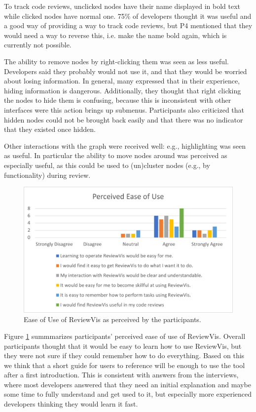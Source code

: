 \documentclass[a4paper,11pt,twoside]{article}
\theoremstyle{definition} %
\begin{document}
To track code reviews, unclicked nodes have their name displayed in bold text while clicked nodes have normal one. 75\% of developers thought it was useful and a good way of providing a way to track code reviews, but P4 mentioned that they would need a way to reverse this, i.e. make the name bold again, which is currently not possible. 

The ability to remove nodes by right-clicking them was seen as less useful. Developers said they probably would not use it, and that they would be worried about losing information. In general, many expressed that in their experience, hiding information is dangerous. Additionally, they thought that right clicking the nodes to hide them is confusing, because this is inconsistent with other interfaces were this action brings up submenus. Participants also criticized that hidden nodes could not be brought back easily and that there was no indicator that they existed once hidden. 

Other interactions with the graph were received well: e.g., highlighting was seen as useful. In particular the ability to move nodes around was perceived as especially useful, as this could be used to (un)cluster nodes (e.g., by functionality) during review.

\begin{figure}[h]
    \centering
    \includegraphics[width=1.0\textwidth]{Subfigures/perceived_ease_of_use.png}
    \caption{Ease of Use of ReviewVis as perceived by the participants.}
    \label{fig:PerceivedEaseOfUse}
\end{figure}

Figure \ref{fig:PerceivedEaseOfUse} summmarizes participants' perceived ease of use of ReviewVis. Overall participants thought that it would be easy to learn how to use ReviewVis, but they were not sure if they could remember how to do everything. Based on this we think that a short guide for users to reference will be enough to use the tool after a first introduction. This is consistent with answers from the interviews, where most developers answered that they need an initial explanation and maybe some time to fully understand and get used to it, but especially more experienced developers thinking they would learn it fast.
\end{document}
